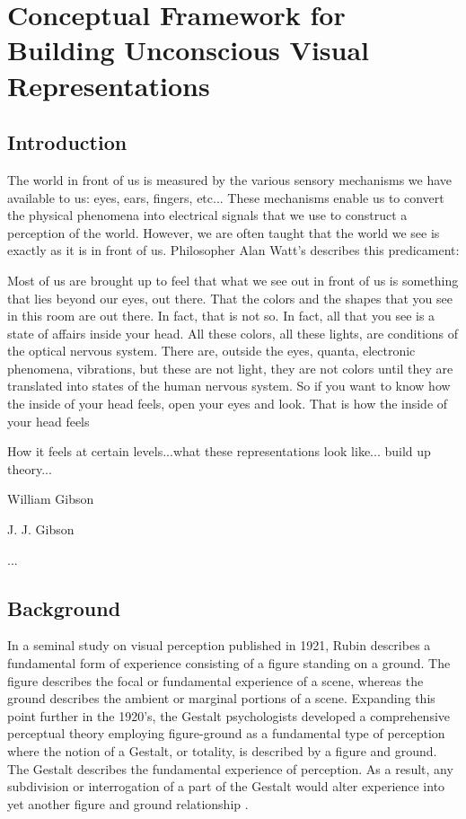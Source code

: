 \documentclass[a4paper,10pt,final]{ThesisStyle}
\begin{document}
\chapter{Conceptual Framework for Building Unconscious Visual Representations}
\label{ch:conceptual-visual}
\minitoc

\section{Introduction}

The world in front of us is measured by the various sensory mechanisms we have available to us: eyes, ears, fingers, etc... These mechanisms enable us to convert the physical phenomena into electrical signals that we use to construct a perception of the world.  However, we are often taught that the world we see is exactly as it is in front of us.  Philosopher Alan Watt's describes this predicament:
\begin{quotationb}
Most of us are brought up to feel that what we see out in front of us is something that lies beyond our eyes, out there. That the colors and the shapes that you see in this room are out there. In fact, that is not so. In fact, all that you see is a state of affairs inside your head. All these colors, all these lights, are conditions of the optical nervous system. There are, outside the eyes, quanta, electronic phenomena, vibrations, but these are not light, they are not colors until they are translated into states of the human nervous system. So if you want to know how the inside of your head feels, open your eyes and look. That is how the inside of your head feels\\
\end{quotationb}
How it feels at certain levels...what these representations look like... build up theory... 


William Gibson

J. J. Gibson

... 

\section{Background}

In a seminal study on visual perception published in 1921, Rubin describes a fundamental form of experience consisting of a figure standing on a ground.  The figure describes the focal or fundamental experience of a scene, whereas the ground describes the ambient or marginal portions of a scene.  Expanding this point further in the 1920's, the Gestalt psychologists developed a comprehensive perceptual theory employing figure-ground as a fundamental type of perception where the notion of a Gestalt, or totality, is described by a figure and ground.  The Gestalt describes the fundamental experience of perception.  As a result, any subdivision or interrogation of a part of the Gestalt would alter experience into yet another figure and ground relationship \cite{Wever1927}.  
\end{document}
